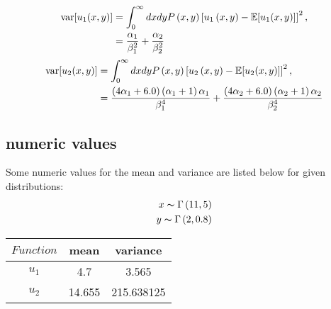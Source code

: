 \begin{align}
  \text{var}[u_1(x,y)] &= \int_{0}^\infty dxdyP\left(x,y\right)\left[u_1\left(x,y\right) - \mathbb{E}[ u_1(x,y)]\right]^2, \notag \\
  &= \frac{\alpha_{1}}{\beta_{1}^2} + \frac{\alpha_{2}}{\beta_{2}^2}
\end{align}
\begin{align}
  \text{var}[u_2(x,y)] &= \int_{0}^\infty dxdyP\left(x,y\right)\left[u_2\left(x,y\right) - \mathbb{E}[ u_2(x,y)]\right]^2, \notag \\
  &= \frac{\left(4\alpha_{1} + 6.0\right)\left(\alpha_{1} + 1\right)\alpha_1}{\beta_{1}^4} + \frac{\left(4\alpha_{2} + 6.0\right)\left(\alpha_{2}+1\right)\alpha_2}{\beta_{2}^4}
\end{align}

\subsection{numeric values}
Some numeric values for the mean and variance are listed below for given distributions:
\begin{align}
  x \thicksim \Gamma\left(11, 5\right) \notag \\
  y \thicksim \Gamma\left(2, 0.8\right) \notag
\end{align}
\begin{table}[h!]
  \centering
  \begin{tabular}{c|c|c}
    $Function$ & mean & variance \\ \hline
    $u_1$ & 4.7    & 3.565 \\
    $u_2$ & 14.655 & 215.638125 \\
  \end{tabular}
\end{table}


